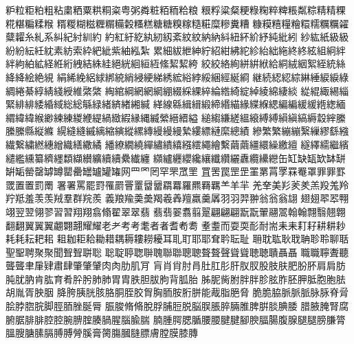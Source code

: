 粐󠄁粒󠄀粔󠄀粕󠄀粗󠄀粘󠄀粛󠄀粞󠄀粟󠄀粠󠄀粡󠄀粢󠄀粤󠄀粥󠄀粦󠄀粧󠄀粨󠄀粫󠄀粭󠄀粮󠄀
粮󠄁粰󠄀粱󠄀粲󠄀粳󠄀粶󠄀粷󠄀粹󠄀粺󠄀粻󠄀粼󠄀粽󠄀精󠄀精󠄁粿󠄀糀󠄀糂󠄀糄󠄀糅󠄀糇󠄀
糈󠄀糉󠄀糊󠄀糍󠄀糎󠄀糏󠄀糒󠄀糓󠄀糔󠄀糕󠄀糖󠄀糖󠄁糗󠄀糘󠄀糙󠄀糚󠄀糜󠄀糝󠄀糞󠄀糟󠄀
糠󠄀糢󠄀糦󠄀糧󠄀糩󠄀糫󠄀糯󠄀糲󠄀糲󠄁糴󠄀糵󠄀糶󠄀糸󠄀糺󠄀系󠄀糾󠄀紀󠄀紂󠄀紃󠄀約󠄀
約󠄁紅󠄀紆󠄀紇󠄀紈󠄀紉󠄀紉󠄁紊󠄀紋󠄀紋󠄁納󠄀納󠄁紏󠄀紐󠄀紑󠄀紒󠄀紓󠄀純󠄀紕󠄀紖󠄀
紗󠄀紘󠄀紙󠄀級󠄀級󠄁紛󠄀紛󠄁紜󠄀紝󠄀紞󠄀素󠄀紡󠄀索󠄀紣󠄀紦󠄀紪󠄀紫󠄀紬󠄀紭󠄀紮󠄀
累󠄀細󠄀紱󠄀紲󠄀紳󠄀紵󠄀紹󠄀紺󠄀紼󠄀紽󠄀紾󠄀紿󠄀絀󠄀絁󠄀終󠄀終󠄁絃󠄀組󠄀絅󠄀絆󠄀
絆󠄁絇󠄀絈󠄀絋󠄀経󠄀絍󠄀絎󠄀絏󠄀結󠄀絑󠄀絓󠄀絕󠄀絖󠄀絗󠄀絙󠄀絚󠄀絛󠄀絜󠄀絜󠄁絝󠄀
絞󠄀絞󠄁絡󠄀絢󠄀絣󠄀絣󠄁絥󠄀給󠄀絧󠄀絨󠄀絪󠄀絮󠄀絰󠄀統󠄀絲󠄀絳󠄀絳󠄁絵󠄀絶󠄀絸󠄀
絹󠄀絺󠄀絻󠄀絽󠄀絿󠄀綁󠄀綂󠄀綃󠄀綅󠄀綆󠄀綈󠄀綉󠄀綋󠄀綌󠄀綍󠄀綏󠄀綑󠄀經󠄀綖󠄀綗󠄀
継󠄀続󠄀綛󠄀綛󠄁綜󠄀綝󠄀綞󠄀綟󠄀綟󠄁綠󠄀綢󠄀綣󠄀綦󠄀綧󠄀綪󠄀綫󠄀綬󠄀維󠄀綮󠄀綮󠄁
綯󠄀綰󠄀綱󠄀網󠄀網󠄁網󠄂綳󠄀綴󠄀綵󠄀綶󠄀綷󠄀綸󠄀綹󠄀綺󠄀綻󠄀綽󠄀綾󠄀綿󠄀緀󠄀緂󠄀
緃󠄀緄󠄀緅󠄀緆󠄀緇󠄀緊󠄀緋󠄀緋󠄁緌󠄀緍󠄀緎󠄀総󠄀総󠄁緐󠄀緑󠄀緒󠄀緕󠄀緖󠄀緗󠄀緘󠄀
緙󠄀線󠄀緜󠄀緝󠄀緝󠄁緞󠄀締󠄀緡󠄀緢󠄀緣󠄀緤󠄀緥󠄀緦󠄀編󠄀編󠄁緩󠄀緩󠄁緪󠄀緫󠄀緬󠄀
緭󠄀緯󠄀緯󠄁緱󠄀緲󠄀練󠄀練󠄁緵󠄀緶󠄀緹󠄀緺󠄀緻󠄀縀󠄀縁󠄀縄󠄀縅󠄀縈󠄀縉󠄀縉󠄁縊󠄀
縋󠄀縐󠄀縑󠄀縒󠄀縕󠄀縗󠄀縛󠄀縛󠄁縜󠄀縝󠄀縞󠄀縟󠄀縠󠄀縡󠄀縢󠄀縢󠄁縢󠄂縣󠄀縦󠄀縧󠄀
縨󠄀縫󠄀縫󠄁縬󠄀縭󠄀縮󠄀縯󠄀縱󠄀縲󠄀縳󠄀縵󠄀縵󠄁縵󠄂縶󠄀縷󠄀縹󠄀縺󠄀縻󠄀總󠄀績󠄀
縿󠄀繁󠄀繁󠄁繃󠄀繃󠄁繄󠄀繅󠄀繆󠄀繇󠄀繈󠄀繊󠄀繋󠄀繍󠄀繎󠄀繐󠄀繒󠄀織󠄀繕󠄀繖󠄀繘󠄀
繙󠄀繚󠄀繝󠄀繞󠄀繟󠄀繡󠄀繢󠄀繥󠄀繦󠄀繧󠄀繩󠄀繪󠄀繫󠄀繭󠄀繭󠄁繮󠄀繯󠄀繰󠄀繳󠄀繵󠄀
繸󠄀繹󠄀繻󠄀繼󠄀繽󠄀繾󠄀繿󠄀纁󠄀纂󠄀纃󠄀纆󠄀纇󠄀纈󠄀纉󠄀纊󠄀續󠄀續󠄁纍󠄀纎󠄀纏󠄀
纐󠄀纑󠄀纒󠄀纓󠄀纔󠄀纕󠄀纖󠄀纘󠄀纚󠄀纛󠄀纜󠄀纝󠄀纞󠄀缶󠄀缸󠄀缺󠄀缻󠄀缼󠄀缽󠄀缾󠄀
缾󠄁缿󠄀罃󠄀罄󠄀罅󠄀罇󠄀罌󠄀罍󠄀罎󠄀罏󠄀罐󠄀罐󠄁网󠄀罒󠄀罓󠄀罔󠄀罕󠄀罘󠄀罛󠄀罜󠄀
罝󠄀罟󠄀罠󠄀罡󠄀罡󠄁罣󠄀罤󠄀罥󠄀罦󠄀罧󠄀罨󠄀罩󠄀罪󠄀罪󠄁罫󠄀罭󠄀置󠄀置󠄁罰󠄀罱󠄀
署󠄀署󠄁罵󠄀罷󠄀罸󠄀罹󠄀罽󠄀罾󠄀罿󠄀羀󠄀羀󠄁羂󠄀羃󠄀羅󠄀羆󠄀羇󠄀羈󠄀羊󠄀羊󠄁羋󠄀
羌󠄀羍󠄀美󠄀羏󠄀羐󠄀羑󠄀羔󠄀羖󠄀羗󠄀羚󠄀羜󠄀羝󠄀羞󠄀羡󠄀羡󠄁羢󠄀羣󠄀群󠄀羦󠄀羨󠄀
義󠄀羪󠄀羭󠄀羮󠄀羮󠄁羯󠄀羲󠄀羴󠄀羶󠄀羸󠄀羹󠄀羼󠄀羽󠄀羽󠄁羿󠄀翀󠄀翁󠄀翁󠄁翁󠄂翃󠄀
翅󠄀翅󠄁翆󠄀翆󠄁翈󠄀翊󠄀翌󠄀翌󠄁翎󠄀翏󠄀習󠄀習󠄁翔󠄀翔󠄁翕󠄀翛󠄀翟󠄀翠󠄀翠󠄁翡󠄀
翡󠄁翡󠄂翣󠄀翥󠄀翦󠄀翨󠄀翩󠄀翩󠄁翩󠄂翫󠄀翫󠄁翬󠄀翮󠄀翯󠄀翰󠄀翰󠄁翲󠄀翳󠄀翹󠄀翺󠄀
翻󠄀翻󠄁翼󠄀翼󠄁翼󠄂翽󠄀翾󠄀翿󠄀耀󠄀耀󠄁老󠄀耂󠄀考󠄀考󠄁耄󠄀者󠄀者󠄁耆󠄀耇󠄀耈󠄀
耊󠄀耋󠄀而󠄀耍󠄀耎󠄀耏󠄀耐󠄀耑󠄀耒󠄀耒󠄁耓󠄀耔󠄀耕󠄀耕󠄁耖󠄀耗󠄀耗󠄁耘󠄀耙󠄀耜󠄀
耝󠄀耞󠄀耟󠄀耠󠄀耡󠄀耤󠄀耦󠄀耨󠄀耬󠄀耮󠄀耰󠄀耳󠄀耴󠄀耵󠄀耶󠄀耶󠄁耷󠄀耹󠄀耺󠄀耻󠄀
耼󠄀耽󠄀耾󠄀耿󠄀聀󠄀聃󠄀聄󠄀聆󠄀聊󠄀聒󠄀聖󠄀聖󠄁聘󠄀聚󠄀聚󠄁聞󠄀聟󠄀聟󠄁聠󠄀聡󠄀
聡󠄁聢󠄀聤󠄀聦󠄀聨󠄀聭󠄀聯󠄀聯󠄁聰󠄀聰󠄁聱󠄀聱󠄁聲󠄀聳󠄀聳󠄁聴󠄀聴󠄁聵󠄀聶󠄀聶󠄁
職󠄀職󠄁聹󠄀聻󠄀聽󠄀聾󠄀聾󠄁聿󠄀肁󠄀肄󠄀肅󠄀肆󠄀肇󠄀肇󠄁肈󠄀肉󠄀肉󠄁肋󠄀肌󠄀肎󠄀
肓󠄀肖󠄀肖󠄁肘󠄀肙󠄀肚󠄀肛󠄀肜󠄀肝󠄀肞󠄀肞󠄁股󠄀肢󠄀肤󠄀肥󠄀肦󠄀肧󠄀肩󠄀肩󠄁肪󠄀
肫󠄀肬󠄀肭󠄀肯󠄀肱󠄀育󠄀肴󠄀肸󠄀肹󠄀肺󠄀肺󠄁胃󠄀胄󠄀胅󠄀胆󠄀胈󠄀胊󠄀背󠄀胍󠄀胎󠄀
胏󠄀胒󠄀胔󠄀胕󠄀胖󠄀胖󠄁胗󠄀胘󠄀胙󠄀胚󠄀胛󠄀胝󠄀胞󠄀胞󠄁胠󠄀胡󠄀胤󠄀胥󠄀胦󠄀胭󠄀
胮󠄀胯󠄀胰󠄀胱󠄀胲󠄀胳󠄀胴󠄀胵󠄀胶󠄀胷󠄀胸󠄀胹󠄀胺󠄀胻󠄀胼󠄀能󠄀胾󠄀脂󠄀脃󠄀脅󠄀
脆󠄀脆󠄁脇󠄀脈󠄀脈󠄁脈󠄂脉󠄀脉󠄁脊󠄀脋󠄀脍󠄀脖󠄀脗󠄀脘󠄀脚󠄀脛󠄀脜󠄀脞󠄀脠󠄀脣󠄀
脤󠄀脧󠄀脩󠄀脩󠄁脫󠄀脬󠄀脯󠄀脰󠄀脱󠄀脳󠄀脵󠄀脹󠄀脺󠄀脼󠄀脽󠄀脾󠄀腁󠄀腅󠄀腆󠄀腇󠄀
腊󠄀腋󠄀腌󠄀腎󠄀腐󠄀腑󠄀腒󠄀腓󠄀腓󠄁腔󠄀腔󠄁腕󠄀腗󠄀腟󠄀腠󠄀腡󠄀腥󠄀腦󠄀腧󠄀腨󠄀
腩󠄀腫󠄀腭󠄀腮󠄀腯󠄀腰󠄀腰󠄁腱󠄀腱󠄁腳󠄀腴󠄀腷󠄀腸󠄀腹󠄀腺󠄀腿󠄀腿󠄁膀󠄀膁󠄀膂󠄀
膃󠄀膄󠄀膅󠄀膆󠄀膈󠄀膊󠄀膊󠄁膋󠄀膎󠄀膏󠄀膐󠄀膓󠄀膕󠄀膖󠄀膘󠄀膚󠄀膛󠄀膜󠄀膝󠄀膞󠄀
